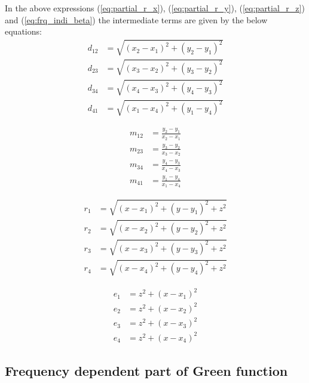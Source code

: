 In the above expressions (\ref{eq:partial_r_x}), (\ref{eq:partial_r_y}), (\ref{eq:partial_r_z}) and (\ref{eq:frq_indi_beta}) the intermediate terms are given by the below equations:
\begin{align}
    d_{12} &= \sqrt{(x_2-x_1)^2+(y_2-y_1)^2}\\
    d_{23} &= \sqrt{(x_3-x_2)^2+(y_3-y_2)^2}\\
    d_{34} &= \sqrt{(x_4-x_3)^2+(y_4-y_3)^2}\\
    d_{41} &= \sqrt{(x_1-x_4)^2+(y_1-y_4)^2}
\end{align}

\begin{align}
    m_{12} &=\frac{y_2-y_1}{x_2-x_1} \\
    m_{23} &=\frac{y_3-y_2}{x_3-x_2} \\
    m_{34} &=\frac{y_4-y_3}{x_4-x_3} \\
    m_{41} &=\frac{y_1-y_4}{x_1-x_4}
\end{align}

\begin{align}
    r_1 &= \sqrt{(x-x_1)^2+(y-y_1)^2+z^2}\\
    r_2 &= \sqrt{(x-x_2)^2+(y-y_2)^2+z^2}\\
    r_3 &= \sqrt{(x-x_3)^2+(y-y_3)^2+z^2}\\
    r_4 &= \sqrt{(x-x_4)^2+(y-y_4)^2+z^2}
\end{align}

\begin{align}
    e_1 &= z^2+(x-x_1)^2\\
    e_2 &= z^2+(x-x_2)^2\\
    e_3 &= z^2+(x-x_3)^2\\
    e_4 &= z^2+(x-x_4)^2
\end{align}

\subsection{Frequency dependent part of Green function}
